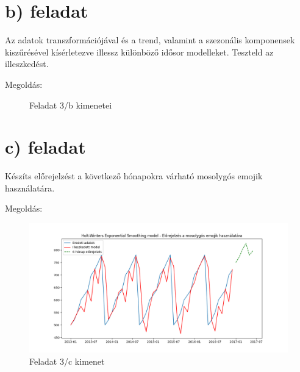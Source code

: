 \documentclass[11pt,a4paper,oneside]{report}
\begin{document}
\section{b) feladat}
Az adatok transzformációjával és a trend, valamint a szezonális komponensek kiszűrésével kísérletezve illessz különböző idősor modelleket. Teszteld az illeszkedést.

Megoldás:

\begin{figure}%
  \centering
  \qquad
  \caption{Feladat 3/b kimenetei}%
  \label{fig:example}%
\end{figure}

\section{c) feladat}
Készíts előrejelzést a következő hónapokra várható mosolygós emojik használatára.

Megoldás:

\begin{figure}[!ht]
  \begin{center}
    \includegraphics[scale=0.4]{Figure_7.png}
    \caption{Feladat 3/c kimenet}
    \label{fig:TexnicCenter}
  \end{center}
\end{figure}
\end{document}
